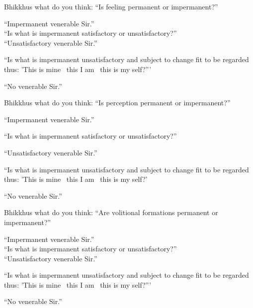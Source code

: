 \begin{english-only-nohang}
Bhikkhus what do you think: ``Is feeling permanent or impermanent?''

``Impermanent venerable Sir.''\\

``Is what is impermanent satisfactory or unsatisfactory?''\\

``Unsatisfactory venerable Sir.''\\

\begin{english-hangtogether}
``Is what is impermanent unsatisfactory and subject to change fit to be regarded thus: 'This is mine \breathmark\ this I am \breathmark\ this is my self?'''
\end{english-hangtogether}

``No venerable Sir.''
\end{english-only-nohang}

\begin{english-only-nohang}
Bhikkhus what do you think: ``Is perception permanent or impermanent?''

``Impermanent venerable Sir.''

``Is what is impermanent satisfactory or unsatisfactory?''

``Unsatisfactory venerable Sir.''

\begin{english-hangtogether}
``Is what is impermanent unsatisfactory and subject to change fit to be regarded thus: 'This is mine \breathmark\ this I am \breathmark\ this is my self?'
\end{english-hangtogether}

``No venerable Sir.''
\end{english-only-nohang}

\begin{english-only-nohang}
Bhikkhus what do you think: ``Are volitional formations permanent or impermanent?''

``Impermanent venerable Sir.''\\

``Is what is impermanent satisfactory or unsatisfactory?'' \\

``Unsatisfactory venerable Sir.''\\

\begin{english-hangtogether}
``Is what is impermanent unsatisfactory and subject to change fit to be regarded thus: 'This is mine \breathmark\ this I am \breathmark\ this is my self?'''
\end{english-hangtogether}

``No venerable Sir.''
\end{english-only-nohang}

